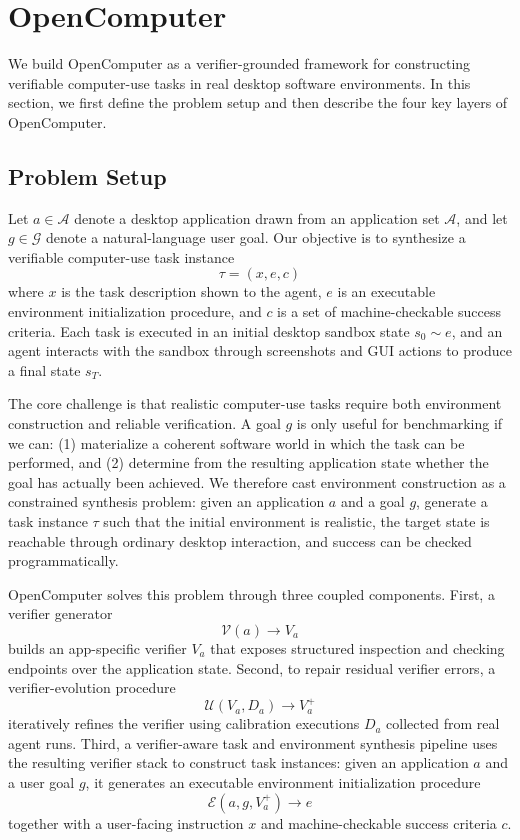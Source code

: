 \documentclass{llmxive}
\providecommand{\ours}{OpenComputer\xspace}
\begin{document}
\section{\ours}
\label{sec:methodology}
We build \ours as a verifier-grounded framework for constructing
verifiable computer-use tasks in real desktop software environments. In this section, we first define the problem setup and then describe the four key layers of \ours.

\subsection{Problem Setup}

Let $a \in \mathcal{A}$ denote a desktop application drawn from an application
set $\mathcal{A}$, and let $g \in \mathcal{G}$ denote a natural-language user
goal. Our objective is to synthesize a verifiable computer-use task instance
\[
\tau = (x, e, c)
\]
where $x$ is the task description shown to the agent, $e$ is an executable
environment initialization procedure, and $c$ is a set of machine-checkable
success criteria. Each task is executed in an initial desktop sandbox state
$s_0 \sim e$, and an agent interacts with the sandbox through screenshots and
GUI actions to produce a final state $s_T$.

The core challenge is that realistic computer-use tasks require both
environment construction and reliable verification. A goal $g$ is only useful
for benchmarking if we can: (1) materialize a coherent software world in which
the task can be performed, and (2) determine from the resulting application
state whether the goal has actually been achieved. We therefore cast environment construction as a constrained synthesis problem: given an application $a$ and a
goal $g$, generate a task instance $\tau$ such that the initial environment is
realistic, the target state is reachable through ordinary desktop interaction,
and success can be checked programmatically.

OpenComputer solves this problem through three coupled components. First, a
verifier generator
\[
\mathcal{V}(a) \rightarrow V_a
\]
builds an app-specific verifier $V_a$ that exposes structured inspection and
checking endpoints over the application state. Second, to repair residual verifier errors, a verifier-evolution procedure
\[
\mathcal{U}(V_a, D_a) \rightarrow V_a^+
\]
iteratively refines the verifier using calibration executions $D_a$ collected
from real agent runs. Third, a verifier-aware task and environment synthesis
pipeline uses the resulting verifier stack to construct task instances: given
an application $a$ and a user goal $g$, it generates an executable environment
initialization procedure
\[
\mathcal{E}(a,g,V_a^+) \rightarrow e
\]
together with a user-facing instruction $x$ and machine-checkable success
criteria $c$.
\end{document}
